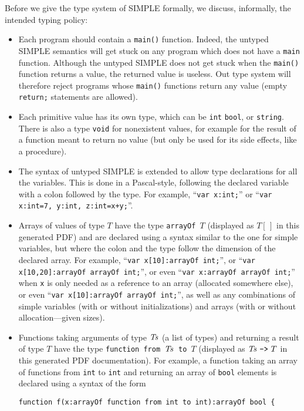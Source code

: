 \begin{latexComment}
Before we give the \K type system of SIMPLE formally, we discuss,
informally, the intended typing policy:
\begin{itemize}
\item Each program should contain a \texttt{main()} function.  Indeed,
the untyped SIMPLE semantics will get stuck on any program which does
not have a \texttt{main} function.  Although the untyped SIMPLE does
not get stuck when the \texttt{main()} function returns a value, the
returned value is useless.  Out type system will therefore reject
programs whose \texttt{main()} functions return any value (empty
\texttt{return;} statements are allowed).
\item Each primitive value has its own type, which can be \texttt{int}
\texttt{bool}, or \texttt{string}.  There is also a type \texttt{void}
for nonexistent values, for example for the result of a function meant
to return no value (but only be used for its side effects, like a
procedure).
\item The syntax of untyped SIMPLE is extended to allow type
declarations for all the variables.  This is done in a Pascal-style,
following the declared variable with a colon followed by the type.
For example, ``\texttt{var x:int;}'' or ``\texttt{var x:int=7, y:int,
z:int=x+y;}''.  \item Arrays of values of type $T$ have the type
\texttt{arrayOf $T$} (displayed as $T[\,]$ in this generated PDF) and
are declared using a syntax similar to the one for simple variables,
but where the colon and the type follow the dimension of the declared
array.  For example, ``\texttt{var x[10]:arrayOf int;}'', or
``\texttt{var x[10,20]:arrayOf arrayOf int;}'', or even
``\texttt{var x:arrayOf arrayOf int;}'' when \texttt{x} is only needed
as a reference to an array (allocated somewhere else), or even
``\texttt{var x[10]:arrayOf arrayOf int;}'', as well as any
combinations of simple variables (with or without initializations) and
arrays (with or without allocation---given sizes).
\item Functions taking arguments of type $\it Ts$ (a list of types)
and returning a result of type $T$ have the type
\texttt{function from $\it Ts$ to $T$} (displayed as
${\it Ts}\ \texttt{->}\ T$ in this generated PDF documentation).  For
example, a function taking an array of functions from \texttt{int} to
\texttt{int} and returning an array of \texttt{bool} elements is
declared using a syntax of the form
\begin{verbatim}
function f(x:arrayOf function from int to int):arrayOf bool {

\end{verbatim}
\end{itemize}
\end{latexComment}
